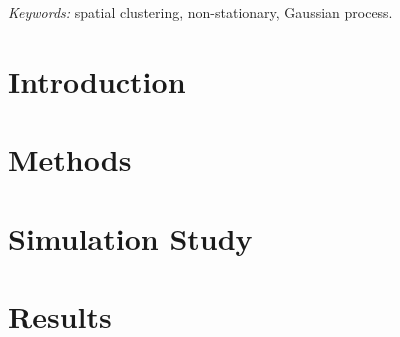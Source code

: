\documentclass[12pt]{article}
\begin{document}
\noindent%
{\it Keywords:} spatial clustering, non-stationary, Gaussian process.
\vfill

\newpage
{} %

\hypertarget{introduction}{%
\section{Introduction}\label{introduction}}

\hypertarget{methods}{%
\section{Methods}\label{methods}}

\hypertarget{simulation}{%
\section{Simulation Study}\label{simulation}}

\hypertarget{results}{%
\section{Results}\label{results}}



\end{document}
